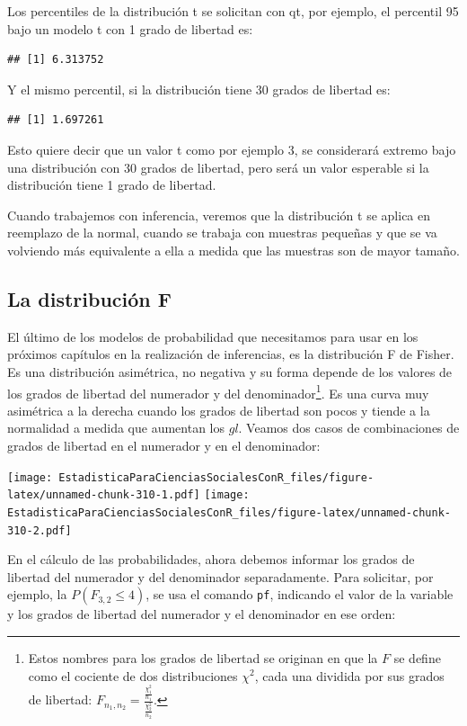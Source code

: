 \documentclass[]{book}
\let\rmarkdownfootnote\footnote%
\def\footnote{\protect\rmarkdownfootnote}
\begin{document}
Los percentiles de la distribución t se solicitan con qt, por ejemplo, el percentil 95 bajo un modelo t con 1 grado de libertad es:

\begin{verbatim}
## [1] 6.313752
\end{verbatim}

Y el mismo percentil, si la distribución tiene 30 grados de libertad es:

\begin{verbatim}
## [1] 1.697261
\end{verbatim}

Esto quiere decir que un valor t como por ejemplo 3, se considerará extremo bajo una distribución con 30 grados de libertad, pero será un valor esperable si la distribución tiene 1 grado de libertad.

Cuando trabajemos con inferencia, veremos que la distribución t se
aplica en reemplazo de la normal, cuando se trabaja con muestras
pequeñas y que se va volviendo más equivalente a ella a medida que las
muestras son de mayor tamaño.

\hypertarget{la-distribuciuxf3n-f}{%
\subsection{La distribución F}\label{la-distribuciuxf3n-f}}

El último de los modelos de probabilidad que necesitamos para usar en
los próximos capítulos en la realización de inferencias, es la
distribución F de Fisher. Es una distribución asimétrica, no negativa y
su forma depende de los valores de los grados de libertad del numerador
y del denominador\footnote{Estos nombres para los grados de libertad se originan en que la \(F\)
  se define como el cociente de dos distribuciones \(\chi^{2}\), cada
  una dividida por sus grados de libertad:
  \(F_{n_{1},n_{2}} = \frac{\frac{\chi_{1}^{2}}{n_{1}}}{\frac{\chi_{2}^{2}}{n_{2}}}\).}. Es una curva muy asimétrica a la derecha cuando
los grados de libertad son pocos y tiende a la normalidad a medida que
aumentan los \(gl\). Veamos dos casos de combinaciones de grados de
libertad en el numerador y en el denominador:

\texttt{[image: EstadisticaParaCienciasSocialesConR\_files/figure-latex/unnamed-chunk-310-1.pdf]} \texttt{[image: EstadisticaParaCienciasSocialesConR\_files/figure-latex/unnamed-chunk-310-2.pdf]}

En el cálculo de las probabilidades, ahora debemos informar los grados
de libertad del numerador y del denominador separadamente. Para
solicitar, por ejemplo, la \(P(F_{3,2} \leq 4)\), se usa el comando \texttt{pf}, indicando el valor de la variable y los grados de libertad del numerador y el denominador en ese orden:
\end{document}
